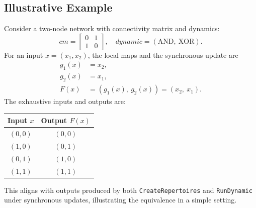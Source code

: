 \documentclass[11pt]{article}
\begin{document}
\subsection{Illustrative Example}
Consider a two-node network with connectivity matrix and dynamics:
\[
cm = \begin{bmatrix}0 & 1\\ 1 & 0\end{bmatrix},\quad dynamic = (\text{AND},\ \text{XOR}).
\]
For an input \(x=(x_1,x_2)\), the local maps and the synchronous update are
\begin{align*}
g_1(x) &= x_2,\\
g_2(x) &= x_1,\\
F(x) &= (g_1(x),\ g_2(x)) = (x_2,\ x_1).
\end{align*}
The exhaustive inputs and outputs are:
\begin{center}
\begin{tabular}{cc}
\toprule
\textbf{Input} $x$ & \textbf{Output} $F(x)$ \\
\midrule
$(0,0)$ & $(0,0)$ \\
$(1,0)$ & $(0,1)$ \\
$(0,1)$ & $(1,0)$ \\
$(1,1)$ & $(1,1)$ \\
\bottomrule
\end{tabular}
\end{center}
This aligns with outputs produced by both \texttt{CreateRepertoires} and \texttt{RunDynamic} under synchronous updates, illustrating the equivalence in a simple setting.
\end{document}
